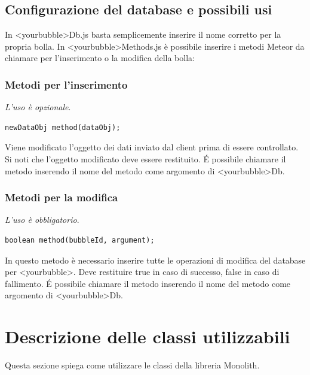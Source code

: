 \subsection{Configurazione del database e possibili usi}

In <yourbubble>Db.js basta semplicemente inserire il nome corretto per la propria bolla. In <yourbubble>Methods.js è possibile inserire i metodi Meteor da chiamare per l'inserimento o la modifica della bolla:

\subsubsection{Metodi per l'inserimento}
\emph{L'uso è opzionale}. 
\begin{lstlisting}
newDataObj method(dataObj);
\end{lstlisting}

Viene modificato l'oggetto dei dati inviato dal client prima di essere controllato. Si noti che l'oggetto modificato deve essere restituito. \'E possibile chiamare il metodo inserendo il nome del metodo come argomento di <yourbubble>Db.

\subsubsection{Metodi per la modifica}
\emph{L'uso è obbligatorio}. 
\begin{lstlisting}
boolean method(bubbleId, argument);
\end{lstlisting}

In questo metodo è necessario inserire tutte le operazioni di modifica del database per <yourbubble>. Deve restituire true in caso di successo, false in caso di fallimento. \'E possibile chiamare il metodo  inserendo
il nome del metodo come argomento di <yourbubble>Db.

\section{Descrizione delle classi utilizzabili}
Questa sezione spiega come utilizzare le classi della libreria Monolith.

